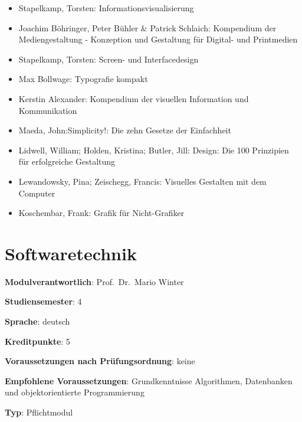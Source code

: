 \begin{itemize}
\tightlist
\item
  Stapelkamp, Torsten: Informationsvisualisierung
\item
  Joachim Böhringer, Peter Bühler \& Patrick Schlaich: Kompendium der
  Mediengestaltung - Konzeption und Gestaltung für Digital- und
  Printmedien
\item
  Stapelkamp, Torsten: Screen- und Interfacedesign
\item
  Max Bollwage: Typografie kompakt
\item
  Kerstin Alexander: Kompendium der visuellen Information und
  Kommunikation
\item
  Maeda, John:Simplicity!: Die zehn Gesetze der Einfachheit
\item
  Lidwell, William; Holden, Kristina; Butler, Jill: Design: Die 100
  Prinzipien für erfolgreiche Gestaltung
\item
  Lewandowsky, Pina; Zeischegg, Francis: Visuelles Gestalten mit dem
  Computer
\item
  Koschembar, Frank: Grafik für Nicht-Grafiker
\end{itemize}

\chapter{Softwaretechnik\label{/mi-2017/modulbeschreibungen-bachelor/BA_Softwaretechnik}}\label{softwaretechnikpathlabelmi-2017modulbeschreibungen-bachelorbaux5fsoftwaretechnik}

\begin{modulHead}
\textbf{Modulverantwortlich}: Prof.~Dr.~Mario
Winter
\end{modulHead}
\begin{modulHead}
\textbf{Studiensemester}:
4
\end{modulHead}
\begin{modulHead}
\textbf{Sprache}:
deutsch
\end{modulHead}
\begin{modulHead}
\textbf{Kreditpunkte}:
5
\end{modulHead}
\begin{modulHead}
\textbf{Voraussetzungen nach
Prüfungsordnung}:
keine
\end{modulHead}
\begin{modulHead}
\textbf{Empfohlene
Voraussetzungen}: Grundkenntnisse Algorithmen, Datenbanken und
objektorientierte
Programmierung
\end{modulHead}
\begin{modulHead}
\textbf{Typ}:
Pflichtmodul
\end{modulHead}


